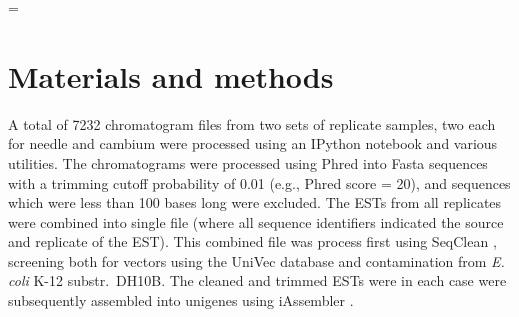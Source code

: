 \documentclass[11pt]{article}
\begin{document}
\newdimen\LTcapwidth \LTcapwidth=\textwidth









\section*{Materials and methods}\label{ss:mats} A total of 7232 chromatogram
files from two sets of replicate samples, two each for needle and cambium were
processed using an IPython \citep[v 2.1]{per-gra:2007} notebook and various
utilities.  The chromatograms were processed using Phred \citep[v.\
020425]{ewing1998b} into Fasta sequences with a trimming cutoff probability of
0.01 (e.g., Phred score = 20), and sequences which were less than 100 bases long
were excluded.  The ESTs from all replicates were combined into single file
(where all sequence identifiers indicated the source and replicate of the EST).
This combined file was process first using SeqClean \citep[v.\ 2/2011][default
parameters]{citeulike:1911083}, screening both for vectors using the UniVec
\citep{cochrane01012010} database and contamination from \textit{E. coli} K-12
substr.\ DH10B.  The cleaned and trimmed ESTs were in each case were
subsequently assembled into unigenes using iAssembler \citep[v.\ 1.3.2][default
parameters]{zheng2011iassembler}.
\end{document}
